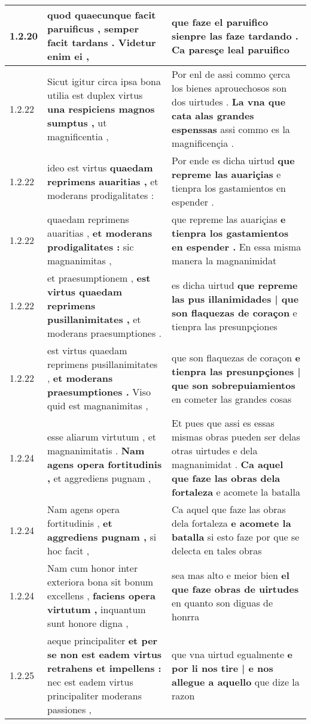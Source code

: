 \begin{tabular}{|p{1cm}|p{6.5cm}|p{6.5cm}|}
1.2.20 & quod quaecunque facit paruificus , \textbf{ semper facit tardans . } Videtur enim ei , & que faze el paruifico \textbf{ sienpre las faze tardando . } Ca paresçe leal paruifico \\\hline
1.2.22 & Sicut igitur circa ipsa bona utilia est duplex virtus \textbf{ una respiciens magnos sumptus , } ut magnificentia , & Por enl de assi commo çerca los bienes aprouechosos son dos uirtudes . \textbf{ La vna que cata alas grandes espenssas } assi commo es la magnificençia . \\\hline
1.2.22 & ideo est virtus \textbf{ quaedam reprimens auaritias , } et moderans prodigalitates : & Por ende es dicha uirtud \textbf{ que repreme las auariçias } e tienpra los gastamientos en espender . \\\hline
1.2.22 & quaedam reprimens auaritias , \textbf{ et moderans prodigalitates : } sic magnanimitas , & que repreme las auariçias \textbf{ e tienpra los gastamientos en espender . } En essa misma manera la magnanimidat \\\hline
1.2.22 & et praesumptionem , \textbf{ est virtus quaedam reprimens pusillanimitates , } et moderans praesumptiones . & es dicha uirtud \textbf{ que repreme las pus illanimidades | que son flaquezas de coraçon } e tienpra las presunpçiones \\\hline
1.2.22 & est virtus quaedam reprimens pusillanimitates , \textbf{ et moderans praesumptiones . } Viso quid est magnanimitas , & que son flaquezas de coraçon \textbf{ e tienpra las presunpçiones | que son sobrepuiamientos } en cometer las grandes cosas \\\hline
1.2.24 & esse aliarum virtutum , et magnanimitatis . \textbf{ Nam agens opera fortitudinis , } et aggrediens pugnam , & Et pues que assi es essas mismas obras pueden ser delas otras uirtudes e dela magnanimidat . \textbf{ Ca aquel que faze las obras dela fortaleza } e acomete la batalla \\\hline
1.2.24 & Nam agens opera fortitudinis , \textbf{ et aggrediens pugnam , } si hoc facit , & Ca aquel que faze las obras dela fortaleza \textbf{ e acomete la batalla } si esto faze por que se delecta en tales obras \\\hline
1.2.24 & Nam cum honor inter exteriora bona sit bonum excellens , \textbf{ faciens opera virtutum , } inquantum sunt honore digna , & sea mas alto e meior bien \textbf{ el que faze obras de uirtudes } en quanto son diguas de honrra \\\hline
1.2.25 & aeque principaliter \textbf{ et per se non est eadem virtus retrahens et impellens : } nec est eadem virtus principaliter moderans passiones , & que vna uirtud egualmente \textbf{ e por li nos tire | e nos allegue a aquello } que dize la razon \\\hline

\end{tabular}
